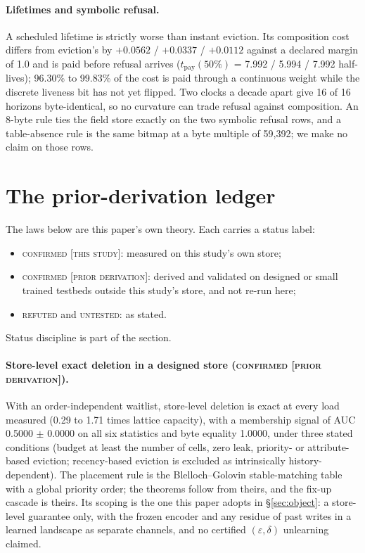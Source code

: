 \documentclass{article} %
\begin{document}
\paragraph{Lifetimes and symbolic refusal.} A scheduled lifetime is strictly worse than instant
eviction. Its composition cost differs from eviction's by $+0.0562$ / $+0.0337$ / $+0.0112$ against a
declared margin of 1.0 and is paid before refusal arrives ($t_{\text{pay}}(50\%)$ = 7.992 / 5.994 /
7.992 half-lives); 96.30\% to 99.83\% of the cost is paid through a continuous weight while the
discrete liveness bit has not yet flipped. %
Two clocks a decade apart give 16 of 16 horizons byte-identical, so no curvature can trade refusal
against composition. An 8-byte rule ties the field store exactly on the two symbolic refusal rows,
and a table-absence rule is the same bitmap at a byte multiple of 59,392; we make no claim on those
rows. %

\section{The prior-derivation ledger}
\label{app:shorts}

The laws below are this paper's own theory. Each carries a status label:
\begin{itemize}[leftmargin=*,nosep]
\item \textsc{confirmed [this study]}: measured on this study's own store;
\item \textsc{confirmed [prior derivation]}: derived and validated on designed or small trained
  testbeds outside this study's store, and not re-run here;
\item \textsc{refuted} and \textsc{untested}: as stated.
\end{itemize}
Status discipline is part of the section.


\paragraph{Store-level exact deletion in a designed store (\textsc{confirmed [prior
derivation]}).} With an order-independent waitlist, store-level deletion is exact at every load
measured (0.29 to 1.71 times lattice capacity), with a membership signal of AUC 0.5000 $\pm$ 0.0000 on all
six statistics and byte equality 1.0000, under three stated conditions (budget at least the number
of cells, zero leak, priority- or attribute-based eviction; recency-based eviction is excluded as
intrinsically history-dependent). %
The placement rule is the Blelloch--Golovin stable-matching table~\citep{blelloch2007strongly} with a global priority order;
the theorems follow from theirs, and the fix-up cascade is theirs. Its scoping is the one this
paper adopts in \S\ref{sec:object}: a store-level guarantee only, with the frozen encoder and any
residue of past writes in a learned landscape as separate channels, and no certified
$(\varepsilon,\delta)$ unlearning claimed. %
\end{document}
